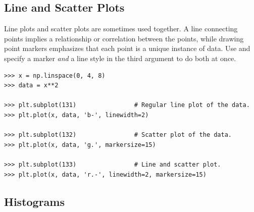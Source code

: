 %

\subsection*{Line and Scatter Plots} %

Line plots and scatter plots are sometimes used together.
A line connecting points implies a relationship or correlation between the points, while drawing point markers emphasizes that each point is a unique instance of data.
Use  and specify a marker \emph{and} a line style in the third argument to do both at once.

\begin{lstlisting}
>>> x = np.linspace(0, 4, 8)
>>> data = x**2

>>> plt.subplot(131)                # Regular line plot of the data.
>>> plt.plot(x, data, 'b-', linewidth=2)

>>> plt.subplot(132)                # Scatter plot of the data.
>>> plt.plot(x, data, 'g.', markersize=15)

>>> plt.subplot(133)                # Line and scatter plot.
>>> plt.plot(x, data, 'r.-', linewidth=2, markersize=15)
\end{lstlisting}

\subsection*{Histograms} %

